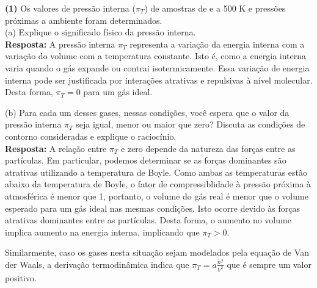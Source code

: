 \textbf{(1)} Os valores de pressão interna (\(\pi_T\)) de amostras de  e
 a 500 K e pressões próximas a ambiente foram determinados.\\

(a) Explique o significado físico da pressão interna.\\

\textbf{Resposta:}   A pressão interna \( \pi_T \) representa a variação da energia interna com a
   variação do volume com a temperatura constante. Isto é, como a energia
   interna varia quando o gás expande ou contrai isotermicamente. Essa variação
   de energia interna pode ser justificada por interações atrativas e repulsivas
   à nível molecular. Desta forma, \( \pi_T = 0 \) para um gás ideal. 

(b) Para cada um desses gases, nessas condições, você espera que o valor da
pressão interna \(\pi_T\)  seja igual, menor ou maior que zero? Discuta as
condições de contorno consideradas e explique o raciocínio.\\

\textbf{Resposta:} A relação entre \( \pi_T \) e zero depende da natureza das
forças entre as partículas. Em particular, podemos determinar se as forças
dominantes são atrativas utilizando a temperatura de Boyle. Como ambas as
temperaturas estão abaixo da temperatura de Boyle, o fator de compressiblidade à
pressão próxima à atmosférica é menor que 1, portanto, o volume do gás real é
menor que o volume esperado para um gás ideal nas mesmas condições. Isto ocorre
devido às forças atrativas dominantes entre as partículas. Desta forma, o
aumento no volume implica aumento na energia interna, implicando que \( \pi_T >
0 \).

Similarmente, caso os gases nesta situação sejam modelados pela equação de Van
der Waals, a derivação termodinâmica indica que \( \pi_T = a \frac{n^2}{V^2} \)
que é sempre um valor positivo.
